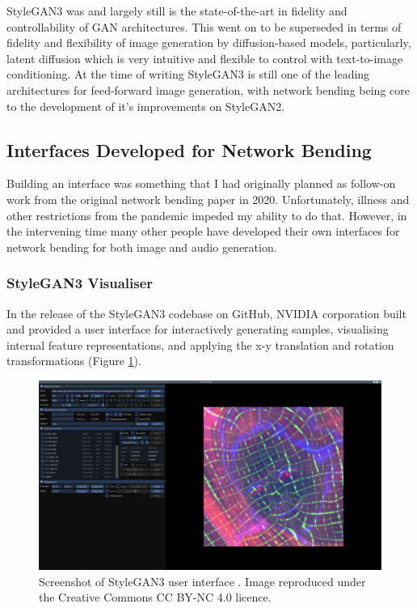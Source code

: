StyleGAN3 was and largely still is the state-of-the-art in fidelity and controllability of GAN architectures. 
This went on to be superseded in terms of fidelity and flexibility of image generation by diffusion-based models, particularly, latent diffusion \citep{rombach2022high} which is very intuitive and flexible to control with text-to-image conditioning.
At the time of writing StyleGAN3 is still one of the leading architectures for feed-forward image generation, with network bending being core to the development of it's improvements on StyleGAN2. 

\subsection{Interfaces Developed for Network Bending}
\label{c7:subsec:net-bend-interfaces}

Building an interface was something that I had originally planned as follow-on work from the original network bending paper in 2020. 
Unfortunately, illness and other restrictions from the pandemic impeded my ability to do that. 
However, in the intervening time many other people have developed their own interfaces for network bending for both image and audio generation.

\subsubsection{StyleGAN3 Visualiser}

In the release of the StyleGAN3 codebase on GitHub, NVIDIA corporation built and provided a user interface for interactively generating samples, visualising internal feature representations, and applying the x-y translation and rotation transformations (Figure \ref{fig:c7:stylegan3-interface}).  

\begin{figure}[!htb]
    \centering
    \captionsetup{justification=centering}
    \includegraphics[width=1\textwidth]{figures/c7_impact/net-bend-technical/stylegan3-vis-interface.png}
    \caption[StyleGAN3 user interface]{Screenshot of StyleGAN3 user interface \citep{karras2021alias}. Image reproduced under the Creative Commons CC BY-NC 4.0 licence.}
    \label{fig:c7:stylegan3-interface}
\end{figure}


